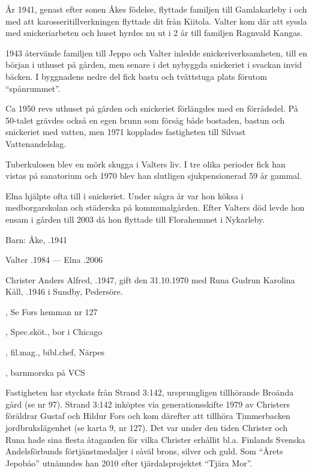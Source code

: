 År 1941, genast efter sonen Åkes födelse, flyttade familjen till Gamlakarleby i och med att karosseritillverkningen flyttade dit från Kiitola. Valter kom där att syssla med snickeriarbeten och huset hyrdes nu ut i 2 år till familjen Ragnvald Kangas.

1943 återvände familjen till Jeppo och Valter inledde snickeriverksamheten, till en början i uthuset på gården, men senare i det nybyggda snickeriet i svackan invid bäcken. I byggnadens nedre del fick bastu och tvättstuga plats förutom ``spånrummet''.

Ca 1950 revs uthuset på gården och snickeriet förlängdes med en förrådsdel. På 50-talet grävdes också en egen brunn som försåg både bostaden, bastun och snickeriet med vatten, men 1971 kopplades fastigheten till Silvast Vattenandelslag.

Tuberkulosen blev en mörk skugga i Valters liv. I tre olika perioder fick han vistas på sanatorium och 1970 blev han slutligen sjukpensionerad 59 år gammal.

Elna hjälpte ofta till i snickeriet. Under några år var hon köksa i medborgarskolan och städerska på kommunalgården. Efter Valters död levde hon ensam i gården till 2003 då hon flyttade till Florahemmet i Nykarleby.

Barn: Åke, .1941

Valter .1984  ---  Elna .2006






Christer Anders Alfred, .1947, gift den 31.10.1970 med Runa Gudrun Karolina Kåll, .1946 i Sundby, Pedersöre.
\begin{jhchildren}
  \item {}, Se Fors hemman nr 127
  \item {}, Spec.sköt., bor i Chicago
  \item {}, fil.mag., bibl.chef, Närpes
  \item {}, barnmorska på VCS
\end{jhchildren}
Fastigheten har styckats från Strand 3:142, ursprungligen tillhörande Broända gård (se nr 97). Strand 3:142 inköptes via generationsskifte 1979 av Christers föräldrar Gustaf och Hildur Fors och kom därefter att tillhöra Timmerbacken jordbrukslägenhet (se karta 9, nr 127). Det var under den tiden Christer och Runa hade sina flesta åtaganden för vilka Christer erhållit bl.a. Finlands Svenska Andelsförbunds förtjänstmedaljer i såväl brons, silver och guld. Som ``Årets Jepobåo'' utnämndes han 2010 efter tjärdalsprojektet ``Tjära Mor''.

